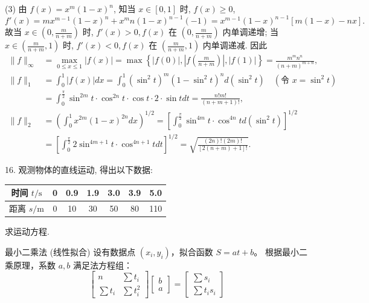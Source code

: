 \documentclass[a4paper,11pt]{ctexart}
\begin{document}
(3) 由 $f(x) = x^m(1-x)^n$, 知当 $x \in [0, 1]$ 时, $f(x) \geqslant 0$,
\[
f'(x) = m x^{m-1}(1-x)^n + x^m n (1-x)^{n-1}(-1) = x^{m-1}(1-x)^{n-1}[m(1-x) - nx].
\]
故当 $x \in \left( 0, \frac{m}{n+m} \right)$ 时, $f'(x) > 0, f(x)$ 在 $\left( 0, \frac{m}{n+m} \right)$ 内单调递增; 当 $x \in \left( \frac{m}{n+m}, 1 \right)$ 时, $f'(x) < 0, f(x)$ 在 $\left( \frac{m}{n+m}, 1 \right)$ 内单调递减. 因此
\begin{align*}
\|f\|_\infty &= \max_{0 \leqslant x \leqslant 1} |f(x)| = \max \left\{ |f(0)|, \left| f\left( \frac{m}{n+m} \right) \right|, |f(1)| \right\} = \frac{m^m n^n}{(n+m)^{m+n}}, \\
\|f\|_1 &= \int_0^1 |f(x)| dx = \int_0^1 (\sin^2 t)^m (1 - \sin^2 t)^n d(\sin^2 t) \quad (\text{令 } x=\sin^2 t) \\
&= \int_0^{\frac{\pi}{2}} \sin^{2m} t \cdot \cos^{2n} t \cdot \cos t \cdot 2 \cdot \sin t dt = \frac{n! m!}{(n+m+1)!}, \\
\|f\|_2 &= \left( \int_0^1 x^{2m}(1-x)^{2n} dx \right)^{1/2} = \left[ \int_0^{\frac{\pi}{2}} \sin^{4m} t \cdot \cos^{4n} t d(\sin^2 t) \right]^{1/2} \\
&= \left[ \int_0^{\frac{\pi}{2}} 2 \sin^{4m+1} t \cdot \cos^{4n+1} t dt \right]^{1/2} = \sqrt{\frac{(2n)!(2m)!}{[2(n+m)+1]!}}.
\end{align*}

\vspace{2em}

16. 观测物体的直线运动, 得出以下数据:
\begin{center}
\begin{tabular}{c|c|c|c|c|c|c}
\toprule
时间 $t/\text{s}$ & 0 & 0.9 & 1.9 & 3.0 & 3.9 & 5.0 \\
\midrule
距离 $s/\text{m}$ & 0 & 10 & 30 & 50 & 80 & 110 \\
\bottomrule
\end{tabular}
\end{center}
求运动方程.

\begin{theorybox}{最小二乘法 (线性拟合)}
设有数据点 $(x_i, y_i)$，拟合函数 $S = at+b$。
根据最小二乘原理，系数 $a, b$ 满足法方程组：
\[
\begin{bmatrix}
n & \sum t_i \\
\sum t_i & \sum t_i^2
\end{bmatrix}
\begin{bmatrix}
b \\ a
\end{bmatrix}
=
\begin{bmatrix}
\sum s_i \\
\sum t_i s_i
\end{bmatrix}
\]
\end{theorybox}
\end{document}

